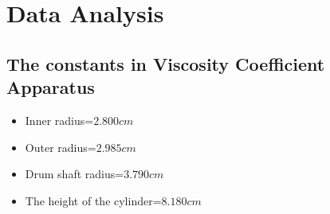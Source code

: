 \documentclass[12pt]{article}
\begin{document}



\section{\textbf{Data Analysis}}

\subsection{The constants in Viscosity Coefficient Apparatus}

\begin{itemize}
    \item Inner radius=$2.800cm$
    \item Outer radius=$2.985cm$
    \item Drum shaft radius=$3.790cm$
    \item The height of the cylinder=$8.180cm$
\end{itemize}

\end{document}
